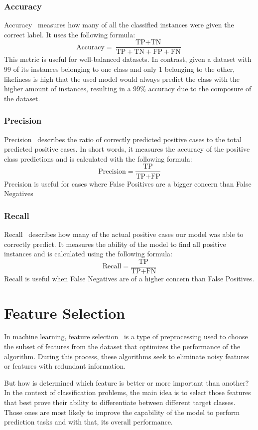 \subsubsection{Accuracy}
Accuracy~\cite{evaluation_metrics} measures how many of all the classified instances were given the correct label.
It uses the following formula:
\[ \text{Accuracy} = \frac{\text{TP} + \text{TN}}{\text{TP} + \text{TN} + \text{FP} + \text{FN}} \]
This metric is useful for well-balanced datasets. In contrast, given a dataset with 99 of its instances belonging to one class and only 1 belonging to the other, likeliness is high that the used model would always predict the class with the higher amount of instances, resulting in a 99\% accuracy due to the composure of the dataset.

\subsubsection{Precision}
Precision~\cite{evaluation_metrics} describes the ratio of correctly predicted positive cases to the total predicted positive cases. In short words, it measures the accuracy of the positive class predictions and is calculated with the following formula:
\[ \text{Precision} = \frac{\text{TP}}{\text{TP} + \text{FP}} \]
Precision is useful for cases where False Positives are a bigger concern than False Negatives

\subsubsection{Recall}
Recall~\cite{evaluation_metrics} describes how many of the actual positive cases our model was able to correctly predict. It measures the ability of the model to find all positive instances and is calculated using the following formula:
\[ \text{Recall} = \frac{\text{TP}}{\text{TP} + \text{FN}} \]
Recall is useful when False Negatives are of a higher concern than False Positives.

\section{Feature Selection}
In machine learning, feature selection~\cite{feature_selection} is a type of preprocessing used to choose the subset of features from the dataset that optimizes the performance of the algorithm. During this process, these algorithms seek to eliminate noisy features or features with redundant information.

But how is determined which feature is better or more important than another? In the context of classification problems, the main idea is to select those features that best prove their ability to differentiate between different target classes. Those ones are most likely to improve the capability of the model to perform prediction tasks and with that, its overall performance.

